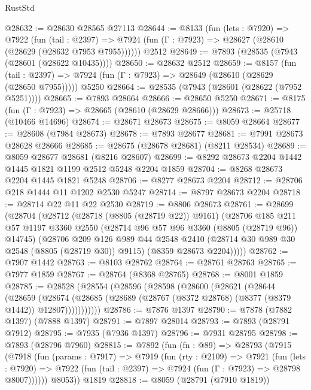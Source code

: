 \begin{lexlean}{RustStd}
\begin{coremodule}
@28632 := @28630 @28565 @27113
@28644 := @8133
    (fun (lets : @7920) =>
    @7922
      (fun (tail : @2397) =>
      @7924 (fun (Γ : @7923) => @28627 (@28610 (@28629 (@28632 @7953 @7955))))))
    @2512
@28649 := @7893 (@28535 (@7943 (@28601 (@28622 @10435))))
@28650 := @28632 @2512
@28659 := @8157
    (fun (tail : @2397) => @7924 (fun (Γ : @7923) => @28649 (@28610 (@28629 (@28650 @7955)))))
    @5250
@28664 := @28535 (@7943 (@28601 (@28622 (@7952 @5251))))
@28665 := @7893 @28664
@28666 := @28650 @5250
@28671 := @8175 (fun (Γ : @7923) => @28665 (@28610 (@28629 @28666)))
@28673 := @25718 (@10466 @14696)
@28674 := @28671 @28673
@28675 := @8059 @28664
@28677 := @28608 (@7984 @28673)
@28678 := @7893 @28677
@28681 := @7991 @28673 @28628 @28666
@28685 := @28675 (@28678 @28681) (@8211 @28534)
@28689 := @8059 @28677 @28681 (@8216 @28607)
@28699 := @8292 @28673 @2204 @1442 @1445 @1821 @1199 @2512 @5248 @2204 @1859
@28704 := @8268 @28673 @2204 @1445 @1821 @5248
@28706 := @8277 @28673 @2204
@28712 := @28706 @218 @1444 @11 @1202 @2530 @5247
@28714 := @8797 @28673 @2204
@28718 := @28714 @22 @11 @22 @2530
@28719 := @8806 @28673
@28761 := @28699
    (@28704
      (@28712
        (@28718 (@8805 (@28719 @22)) @9161)
        (@28706
          @185
          @211
          @57
          @1197
          @3360
          @2550
          (@28714 @96 @57 @96 @3360 (@8805 (@28719 @96)) @14745)
          (@28706
            @209
            @126
            @989
            @44
            @2548
            @2410
            (@28714 @30 @989 @30 @2548 (@8805 (@28719 @30)) @9115)
            (@8359 @28673 @2204)))))
@28762 := @7907 @1442
@28763 := @8103 @28762
@28764 := @28761 @28763
@28765 := @7977 @1859
@28767 := @28764 (@8368 @28765)
@28768 := @8001 @1859
@28785 := @28528
    (@28554
      (@28596
        (@28598
          (@28600
            (@28621
              (@28644
                (@28659
                  (@28674
                    (@28685 (@28689 (@28767 (@8372 @28768) (@8377 (@8379 @1442)) @12807)))))))))))
@28786 := @7876 @1397
@28790 := @7878 (@7882 @1397) (@7888 @1397)
@28791 := @7897 @28014
@28793 := @7893 (@28791 @7912)
@28795 := @7935 (@7936 @1397)
@28796 := @7931 @28795
@28798 := @7893 (@28796 @7960)
@28815 := @7892
    (fun (fn : @89) =>
    @28793
      (@7915
        (@7918
          (fun (params : @7917) =>
          @7919
            (fun (rty : @2109) =>
            @7921
              (fun (lets : @7920) =>
              @7922 (fun (tail : @2397) => @7924 (fun (Γ : @7923) => @28798 @8007))))))
        @8053))
    @1819
@28818 := @8059 (@28791 (@7910 @1819))

\end{coremodule}
\end{lexlean}
